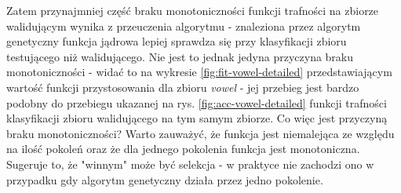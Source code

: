 %	
%	
%	
%
%	
%	
%		
%	

	\FloatBarrier
	Zatem przynajmniej część braku monotoniczności funkcji trafności na zbiorze walidującym wynika z przeuczenia algorytmu - znaleziona przez algorytm genetyczny funkcja jądrowa lepiej sprawdza się przy klasyfikacji zbioru testującego niż walidującego. Nie jest to jednak jedyna przyczyna braku monotoniczności - widać to na wykresie \ref{fig:fit-vowel-detailed} przedstawiającym wartość funkcji przystosowania dla zbioru \emph{vowel} - jej przebieg jest bardzo podobny do przebiegu ukazanej na rys. \ref{fig:acc-vowel-detailed} funkcji trafności klasyfikacji zbioru walidującego na tym samym zbiorze. Co więc jest przyczyną braku monotoniczności? Warto zauważyć, że funkcja jest niemalejąca ze względu na ilość pokoleń oraz że dla jednego pokolenia funkcja jest monotoniczna. Sugeruje to, że "winnym" może być selekcja - w praktyce nie zachodzi ono w przypadku gdy algorytm genetyczny działa przez jedno pokolenie.

